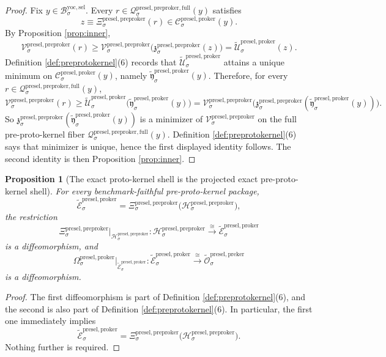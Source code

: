 \documentclass[11pt]{article}
\newcommand{\YoctoSelectorBody}[1]{\mathcal B_{#1}^{\mathrm{yoc,sel}}}
\newcommand{\ProtoKernelProj}[1]{\Omega_{#1}^{\mathrm{presel,proker}}}
\newcommand{\ProtoKernelFullFiber}[2]{\mathcal C_{#1}^{\mathrm{presel,proker}}(#2)}
\newcommand{\PreProtoKernelProj}[1]{\Xi_{#1}^{\mathrm{presel,preproker}}}
\newcommand{\PreProtoKernelFunctional}[1]{\mathscr V_{#1}^{\mathrm{presel,preproker}}}
\newcommand{\PreProtoKernelMinLift}[1]{\mathfrak z_{#1}^{\mathrm{presel,preproker}}}
\newcommand{\PreProtoKernelFullFiber}[2]{\mathcal Q_{#1}^{\mathrm{presel,preproker,full}}(#2)}
\newcommand{\PreProtoKernelShell}[1]{\mathcal H_{#1}^{\mathrm{presel,preproker}}}
\newcommand{\InducedPreKernelShell}[1]{\widetilde{\mathcal O}_{#1}^{\mathrm{presel,preker}}}
\newcommand{\InducedProtoKernelFunctional}[1]{\widetilde{\mathscr U}_{#1}^{\mathrm{presel,proker}}}
\newcommand{\InducedProtoKernelFullMin}[1]{\widetilde{\mathfrak y}_{#1}^{\mathrm{presel,proker}}}
\newcommand{\InducedProtoKernelShell}[1]{\widetilde{\mathcal E}_{#1}^{\mathrm{presel,proker}}}
\newtheorem{proposition}{Proposition}
\begin{document}
\begin{proof}
Fix \(y\in\YoctoSelectorBody{\sigma}\). Every \(r\in\PreProtoKernelFullFiber{\sigma}{y}\) satisfies
\[
z\equiv\PreProtoKernelProj{\sigma}(r)\in\ProtoKernelFullFiber{\sigma}{y}.
\]
By Proposition \ref{prop:inner},
\[
\PreProtoKernelFunctional{\sigma}(r)
\geq
\PreProtoKernelFunctional{\sigma}\bigl(\PreProtoKernelMinLift{\sigma}(z)\bigr)
=
\InducedProtoKernelFunctional{\sigma}(z).
\]
Definition \ref{def:preprotokernel}(6) records that \(\InducedProtoKernelFunctional{\sigma}\) attains a unique minimum on \(\ProtoKernelFullFiber{\sigma}{y}\), namely \(\InducedProtoKernelFullMin{\sigma}(y)\). Therefore, for every \(r\in\PreProtoKernelFullFiber{\sigma}{y}\),
\[
\PreProtoKernelFunctional{\sigma}(r)
\geq
\InducedProtoKernelFunctional{\sigma}\bigl(\InducedProtoKernelFullMin{\sigma}(y)\bigr)
=
\PreProtoKernelFunctional{\sigma}\bigl(\PreProtoKernelMinLift{\sigma}(\InducedProtoKernelFullMin{\sigma}(y))\bigr).
\]
So \(\PreProtoKernelMinLift{\sigma}(\InducedProtoKernelFullMin{\sigma}(y))\) is a minimizer of \(\PreProtoKernelFunctional{\sigma}\) on the full pre-proto-kernel fiber \(\PreProtoKernelFullFiber{\sigma}{y}\). Definition \ref{def:preprotokernel}(6) says that minimizer is unique, hence the first displayed identity follows. The second identity is then Proposition \ref{prop:inner}.
\end{proof}

\begin{proposition}[The exact proto-kernel shell is the projected exact pre-proto-kernel shell]
\label{prop:shell}
For every benchmark-faithful pre-proto-kernel package,
\[
\InducedProtoKernelShell{\sigma}
=
\PreProtoKernelProj{\sigma}\bigl(\PreProtoKernelShell{\sigma}\bigr),
\]
the restriction
\[
\PreProtoKernelProj{\sigma}\big|_{\PreProtoKernelShell{\sigma}}
:
\PreProtoKernelShell{\sigma}\xrightarrow{\cong}\InducedProtoKernelShell{\sigma}
\]
is a diffeomorphism, and
\[
\ProtoKernelProj{\sigma}\big|_{\InducedProtoKernelShell{\sigma}}
:
\InducedProtoKernelShell{\sigma}\xrightarrow{\cong}\InducedPreKernelShell{\sigma}
\]
is a diffeomorphism.
\end{proposition}

\begin{proof}
The first diffeomorphism is part of Definition \ref{def:preprotokernel}(6), and the second is also part of Definition \ref{def:preprotokernel}(6). In particular, the first one immediately implies
\[
\InducedProtoKernelShell{\sigma}
=
\PreProtoKernelProj{\sigma}\bigl(\PreProtoKernelShell{\sigma}\bigr).
\]
Nothing further is required.
\end{proof}
\end{document}
